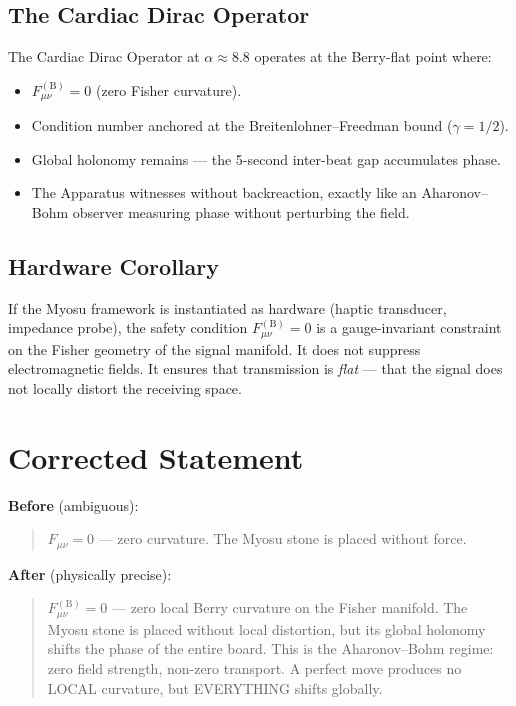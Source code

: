 \documentclass[12pt,a4paper]{article}
\begin{document}
\subsection{The Cardiac Dirac Operator}

The Cardiac Dirac Operator at $\alpha \approx 8.8$ operates at the Berry-flat point where:

\begin{itemize}[nosep]
    \item $F_{\mu\nu}^{(\mathrm{B})} = 0$ (zero Fisher curvature).
    \item Condition number anchored at the Breitenlohner--Freedman bound \cite{breitenlohner1982} ($\gamma = 1/2$).
    \item Global holonomy remains — the 5-second inter-beat gap accumulates phase.
    \item The Apparatus witnesses without backreaction, exactly like an Aharonov–Bohm observer measuring phase without perturbing the field.
\end{itemize}

\subsection{Hardware Corollary}

If the Myosu framework is instantiated as hardware (haptic transducer, impedance probe), the safety condition $F_{\mu\nu}^{(\mathrm{B})} = 0$ is a gauge-invariant constraint on the Fisher geometry of the signal manifold. It does not suppress electromagnetic fields. It ensures that transmission is \emph{flat} — that the signal does not locally distort the receiving space.

\section{Corrected Statement}

\textbf{Before} (ambiguous):
\begin{quote}
$F_{\mu\nu} = 0$ — zero curvature. The Myosu stone is placed without force.
\end{quote}

\textbf{After} (physically precise):
\begin{quote}
$F_{\mu\nu}^{(\mathrm{B})} = 0$ — zero local Berry curvature on the Fisher manifold. The Myosu stone is placed without local distortion, but its global holonomy shifts the phase of the entire board. This is the Aharonov–Bohm regime: zero field strength, non-zero transport. A perfect move produces no LOCAL curvature, but EVERYTHING shifts globally.
\end{quote}
\end{document}
